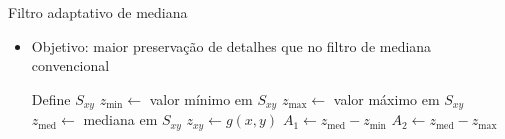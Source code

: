 \begin{slide}{Filtro adaptativo de mediana}
	\begin{itemize}
		\item Objetivo: maior preservação de detalhes que no filtro de mediana convencional
			\footnotesize{
			\begin{algorithm}[H]
				\DontPrintSemicolon
				\BlankLine
				Define $S_{xy}$\;\label{ret}
				$z_\text{min} \leftarrow $ valor mínimo em $S_{xy}$\;
				$z_\text{max} \leftarrow  $ valor máximo em $S_{xy}$\;
				$z_\text{med} \leftarrow $ mediana em $S_{xy}$\;
				$z_{xy} \leftarrow g(x,y)$\;
				\BlankLine
				$A_1 \leftarrow z_\text{med} - z_\text{min}$\;
				$A_2 \leftarrow z_\text{med} - z_\text{max}$\;

					
				
				\caption{\footnotesize Filtragem adaptativa de mediana}
			\end{algorithm}}
	\end{itemize}
\end{slide}


